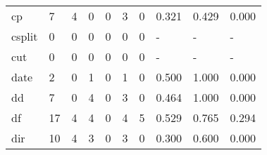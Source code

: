 \begin{longtable}{lp{1.3cm}p{1.3cm}p{1.3cm}p{1.3cm}p{1.3cm}p{1.3cm}p{1.3cm}p{1.3cm}p{1.3cm}}
cp        &                      7 &                                  4 &                                 0 &                                0 &                                 3 &                               0 &                                0.321 &                                  0.429 &                                0.000 \\
csplit    &                      0 &                                  0 &                                 0 &                                0 &                                 0 &                               0 &                                    - &                                      - &                                    - \\
cut       &                      0 &                                  0 &                                 0 &                                0 &                                 0 &                               0 &                                    - &                                      - &                                    - \\
date      &                      2 &                                  0 &                                 1 &                                0 &                                 1 &                               0 &                                0.500 &                                  1.000 &                                0.000 \\
dd        &                      7 &                                  0 &                                 4 &                                0 &                                 3 &                               0 &                                0.464 &                                  1.000 &                                0.000 \\
df        &                     17 &                                  4 &                                 4 &                                0 &                                 4 &                               5 &                                0.529 &                                  0.765 &                                0.294 \\
dir       &                     10 &                                  4 &                                 3 &                                0 &                                 3 &                               0 &                                0.300 &                                  0.600 &                                0.000 \\

\end{longtable}
